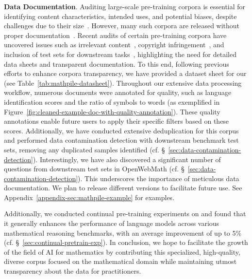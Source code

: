 \textbf{Data Documentation}. Auditing large-scale pre-training corpora is essential for identifying content characteristics, intended uses, and potential biases, despite challenges due to their size~\citep{bender-friedman-2018-data,10.1145/3458723-datasheets-for-datasets,10.1145/3594737-data-statements}. However, many such corpora are released without proper documentation~\citep{DBLP:journals/corr/abs-2212-05129-measuring-data}. Recent audits of certain pre-training corpora have uncovered issues such as irrelevant content~\citep{luccioni-viviano-2021-whats,kreutzer-etal-2022-quality,DBLP:journals/corr/abs-2310-20707-what-in-my-big-data}, copyright infringement~\citep{DBLP:journals/corr/abs-2105-05241-datasheet-for-bookcorpus}, and inclusion of test sets for downstream tasks~\citep{10.1145/3359591.3359735-code-duplication,dodge-etal-2021-documenting}, highlighting the need for detailed data sheets and transparent documentation. To this end, following previous efforts to enhance corpora transparency,  we have provided a dataset sheet for our \mathpile (see Table~\ref{tab:mathpile-datasheet}). Throughout our extensive data processing workflow, numerous documents were annotated for quality, such as language identification scores and the ratio of symbols to words (as exemplified in Figure~\ref{fig:cleaned-example-doc-with-quality-annotation}). These quality annotations enable future users to apply their specific filters based on these scores. Additionally, we have conducted extensive deduplication for this corpus and performed data contamination detection with downstream benchmark test sets, removing any duplicated samples identified (cf. \S~\ref{sec:data-contamination-detection}). Interestingly, we have also discovered a significant number of questions from downstream test sets in OpenWebMath (cf. \S~\ref{sec:data-contamination-detection}). This underscores the importance of meticulous data documentation. We plan to release different versions to facilitate future use. See Appendix~\ref{appendix-sec:mathpile-example} for examples.

Additionally, we conducted continual pre-training experiments on \mathpile and found that it generally enhances the performance of language models across various mathematical reasoning benchmarks, with an average improvement of up to 5\% (cf. \S~\ref{sec:continual-pretrain-exp}). In conclusion, we hope to facilitate the growth of the field of AI for mathematics by contributing this specialized, high-quality, diverse corpus focused on the mathematical domain while maintaining utmost transparency about the data for practitioners. 

